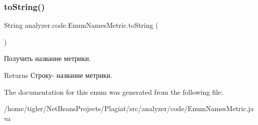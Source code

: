 \subsubsection{\texorpdfstring{to\+String()}{toString()}}
{\footnotesize\ttfamily String analyzer.\+code.\+Enum\+Names\+Metric.\+to\+String (\begin{DoxyParamCaption}{ }\end{DoxyParamCaption})\hspace{0.3cm}{\ttfamily [inline]}}

Получить название метрики. \begin{DoxyReturn}{Returns}
Строку-\/ название метрики. 
\end{DoxyReturn}


The documentation for this enum was generated from the following file\+:\begin{DoxyCompactItemize}
\item 
/home/tigler/\+Net\+Beans\+Projects/\+Plagiat/src/analyzer/code/Enum\+Names\+Metric.\+java\end{DoxyCompactItemize}
